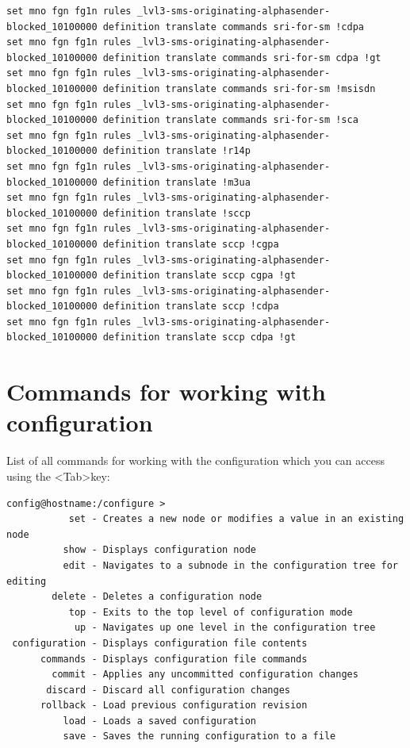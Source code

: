 \documentclass[a4paper,latin]{paper}
\begin{document}
\begin{lstlisting}[style=BashInputStyle]
set mno fgn fg1n rules _lvl3-sms-originating-alphasender-blocked_10100000 definition translate commands sri-for-sm !cdpa
set mno fgn fg1n rules _lvl3-sms-originating-alphasender-blocked_10100000 definition translate commands sri-for-sm cdpa !gt
set mno fgn fg1n rules _lvl3-sms-originating-alphasender-blocked_10100000 definition translate commands sri-for-sm !msisdn
set mno fgn fg1n rules _lvl3-sms-originating-alphasender-blocked_10100000 definition translate commands sri-for-sm !sca
set mno fgn fg1n rules _lvl3-sms-originating-alphasender-blocked_10100000 definition translate !r14p
set mno fgn fg1n rules _lvl3-sms-originating-alphasender-blocked_10100000 definition translate !m3ua
set mno fgn fg1n rules _lvl3-sms-originating-alphasender-blocked_10100000 definition translate !sccp
set mno fgn fg1n rules _lvl3-sms-originating-alphasender-blocked_10100000 definition translate sccp !cgpa
set mno fgn fg1n rules _lvl3-sms-originating-alphasender-blocked_10100000 definition translate sccp cgpa !gt
set mno fgn fg1n rules _lvl3-sms-originating-alphasender-blocked_10100000 definition translate sccp !cdpa
set mno fgn fg1n rules _lvl3-sms-originating-alphasender-blocked_10100000 definition translate sccp cdpa !gt
\end{lstlisting}

\section{Commands for working with configuration}

List of all commands for working with the configuration which you can access using the
\textless{}Tab\textgreater key:
\begin{lstlisting}[style=BashInputStyle]
config@hostname:/configure > 
           set - Creates a new node or modifies a value in an existing node
          show - Displays configuration node
          edit - Navigates to a subnode in the configuration tree for editing
        delete - Deletes a configuration node
           top - Exits to the top level of configuration mode
            up - Navigates up one level in the configuration tree
 configuration - Displays configuration file contents
      commands - Displays configuration file commands
        commit - Applies any uncommitted configuration changes
       discard - Discard all configuration changes            
      rollback - Load previous configuration revision
          load - Loads a saved configuration
          save - Saves the running configuration to a file
\end{lstlisting}
\end{document}
